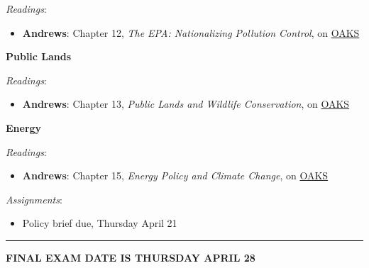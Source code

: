 \emph{Readings}:

\begin{itemize}

\item
  \textbf{Andrews}: Chapter 12, \emph{The EPA: Nationalizing Pollution
  Control}, on \href{https://lms.cofc.edu}{OAKS}
\end{itemize}

\week \textbf{Public Lands}

\emph{Readings}:

\begin{itemize}

\item
  \textbf{Andrews}: Chapter 13, \emph{Public Lands and Wildlife
  Conservation}, on \href{https://lms.cofc.edu}{OAKS}
\end{itemize}

\week \textbf{Energy}

\emph{Readings}:

\begin{itemize}

\item
  \textbf{Andrews}: Chapter 15, \emph{Energy Policy and Climate Change},
  on \href{https://lms.cofc.edu}{OAKS}
\end{itemize}

\vspace{0.10in}

\emph{Assignments}:

\begin{itemize}

\item
  Policy brief due, Thursday April 21
\end{itemize}

\begin{center}\rule{0.5\linewidth}{0.5pt}\end{center}

\noindent \textbf{FINAL EXAM DATE IS THURSDAY APRIL 28}

